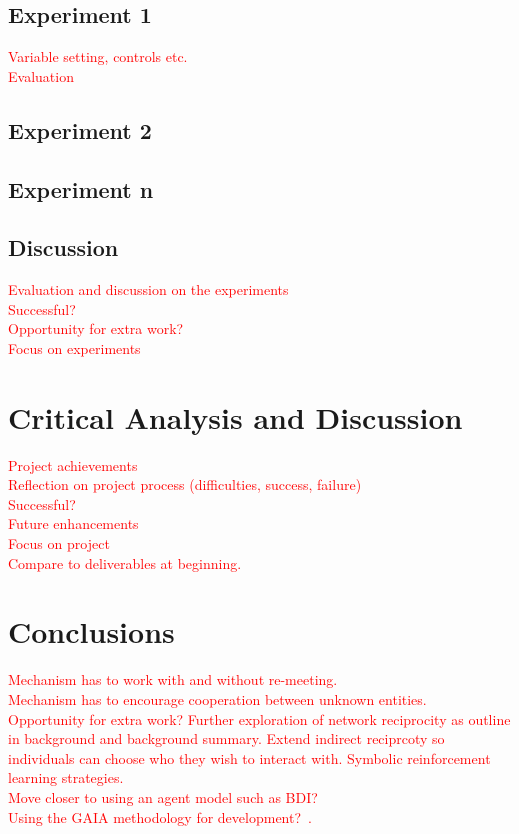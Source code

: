 \documentclass[]{final_report}
\begin{document}
\section{Experiment 1}
\textcolor{red}{Variable setting, controls etc.\\
Evaluation}

\section{Experiment 2}

\section{Experiment n}

\section{Discussion}
\textcolor{red}{Evaluation and discussion on the experiments\\
Successful?\\
Opportunity for extra work?\\
Focus on experiments}

\chapter{Critical Analysis and Discussion}
\textcolor{red}{Project achievements\\
Reflection on project process (difficulties, success, failure)\\
Successful?\\
Future enhancements\\
Focus on project\\
Compare to deliverables at beginning.}

\chapter{Conclusions}
\textcolor{red}{Mechanism has to work with and without re-meeting.\\
Mechanism has to encourage cooperation between unknown entities.\\
Opportunity for extra work? Further exploration of network reciprocity as outline in background and background summary. Extend indirect reciprcoty so individuals can choose who they wish to interact with. Symbolic reinforcement learning strategies.\\
Move closer to using an agent model such as BDI?\\
Using the GAIA methodology for development?~\cite{wooldridge2000gaia}.\\}
\end{document}
